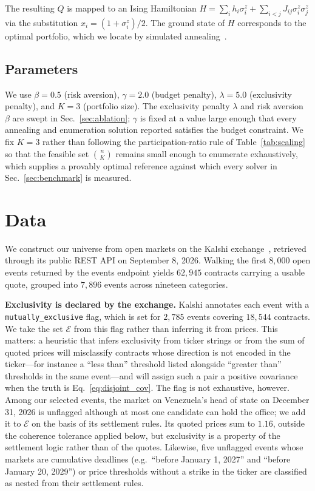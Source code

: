 \documentclass[aps, reprint, prl, twocolumn, superscriptaddress,amsmath,amssymb,noeprint]{revtex4-2}
\begin{document}
The resulting $Q$ is mapped to an Ising Hamiltonian
$H = \sum_i h_i \sigma_i^z + \sum_{i<j} J_{ij}\sigma_i^z\sigma_j^z$
via the substitution $x_i = (1+\sigma_i^z)/2$.  The ground state of $H$
corresponds to the optimal portfolio, which we locate by simulated
annealing~\cite{kirkpatrick1983}.
\subsection{Parameters}

We use $\beta = 0.5$ (risk aversion), $\gamma = 2.0$ (budget penalty),
$\lambda = 5.0$ (exclusivity penalty), and $K = 3$ (portfolio size).
The exclusivity penalty $\lambda$ and risk aversion $\beta$ are swept in
Sec.~\ref{sec:ablation}; $\gamma$ is fixed at a
value large enough that every annealing and enumeration solution reported
satisfies the budget constraint.  We fix $K=3$
rather than following the participation-ratio rule of
Table~\ref{tab:scaling} so that the feasible set $\binom{n}{K}$ remains
small enough to enumerate exhaustively, which supplies a provably optimal
reference against which every solver in Sec.~\ref{sec:benchmark} is
measured.

\section{Data}

We construct our universe from open markets on the Kalshi
exchange~\cite{kalshi}, retrieved through its public REST API on
September 8, 2026.  Walking the first $8{,}000$ open events returned by the
events endpoint yields $62{,}945$ contracts carrying a usable quote, grouped
into $7{,}896$ events across nineteen categories.

\textbf{Exclusivity is declared by the exchange.}  Kalshi annotates each event
with a \texttt{mutually\_exclusive} flag, which is set for $2{,}785$ events
covering $18{,}544$ contracts.  We take the set $\mathcal{E}$ from this
flag rather than inferring it from prices.  This matters: a heuristic that
infers exclusivity from ticker strings or from the sum of quoted prices will
misclassify contracts whose direction is not encoded in the ticker---for
instance a ``less than'' threshold listed alongside ``greater than'' thresholds
in the same event---and will assign such a pair a positive covariance when the
truth is Eq.~\eqref{eq:disjoint_cov}.  The flag is not exhaustive, however.
Among our selected events, the market on Venezuela's head of state on
December 31, 2026 is unflagged although at most one candidate can hold the
office; we add it to $\mathcal{E}$ on the basis of its settlement rules.  Its
quoted prices sum to $1.16$, outside the coherence tolerance applied below,
but exclusivity is a property of the settlement logic rather than of the
quotes.  Likewise, five unflagged events whose markets are cumulative
deadlines (e.g.\ ``before January 1, 2027'' and ``before January 20, 2029'')
or price thresholds without a strike in the ticker are classified as nested
from their settlement rules.
\end{document}

